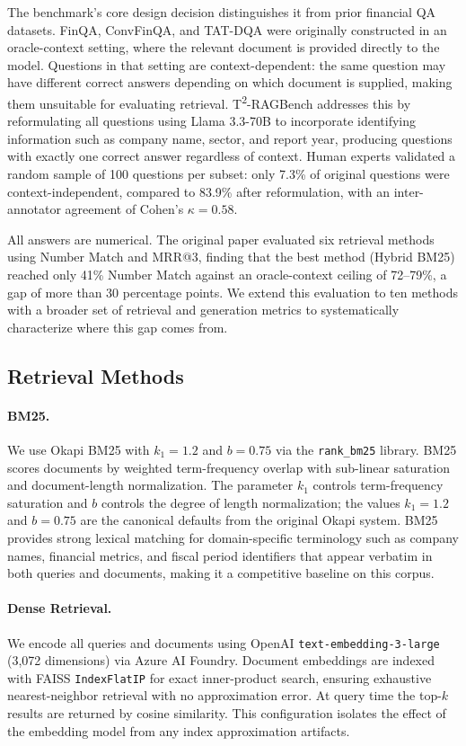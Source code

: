 \documentclass[11pt]{article}
\begin{document}
The benchmark's core design decision distinguishes it from prior financial QA datasets. FinQA, ConvFinQA, and TAT-DQA were originally constructed in an oracle-context setting, where the relevant document is provided directly to the model. Questions in that setting are context-dependent: the same question may have different correct answers depending on which document is supplied, making them unsuitable for evaluating retrieval. T\textsuperscript{2}-RAGBench addresses this by reformulating all questions using Llama 3.3-70B to incorporate identifying information such as company name, sector, and report year, producing questions with exactly one correct answer regardless of context. Human experts validated a random sample of 100 questions per subset: only 7.3\% of original questions were context-independent, compared to 83.9\% after reformulation, with an inter-annotator agreement of Cohen's $\kappa = 0.58$.

All answers are numerical. The original paper evaluated six retrieval methods using Number Match and MRR@3, finding that the best method (Hybrid BM25) reached only 41\% Number Match against an oracle-context ceiling of 72--79\%, a gap of more than 30 percentage points. We extend this evaluation to ten methods with a broader set of retrieval and generation metrics to systematically characterize where this gap comes from.

\subsection{Retrieval Methods}
\label{sec:methods}

\paragraph{BM25.}
We use Okapi BM25 \citep{robertson1994okapi} with $k_1 = 1.2$ and $b = 0.75$ via the \texttt{rank\_bm25} library. BM25 scores documents by weighted term-frequency overlap with sub-linear saturation and document-length normalization. The parameter $k_1$ controls term-frequency saturation and $b$ controls the degree of length normalization; the values $k_1 = 1.2$ and $b = 0.75$ are the canonical defaults from the original Okapi system. BM25 provides strong lexical matching for domain-specific terminology such as company names, financial metrics, and fiscal period identifiers that appear verbatim in both queries and documents, making it a competitive baseline on this corpus.

\paragraph{Dense Retrieval.}
We encode all queries and documents using OpenAI \texttt{text-embedding-3-large} (3,072 dimensions) via Azure AI Foundry. Document embeddings are indexed with FAISS \texttt{IndexFlatIP} for exact inner-product search, ensuring exhaustive nearest-neighbor retrieval with no approximation error. At query time the top-$k$ results are returned by cosine similarity. This configuration isolates the effect of the embedding model from any index approximation artifacts.
\end{document}
